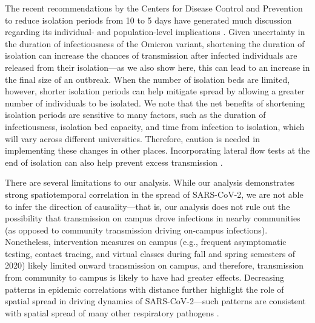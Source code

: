 \documentclass[12pt]{article}
\begin{document}
The recent recommendations by the Centers for Disease Control and Prevention to reduce isolation periods from 10 to 5 days \citep{cdcisolation} have generated much discussion regarding its individual- and population-level implications \citep{soljak2022reducing}.
Given uncertainty in the duration of infectiousness of the Omicron variant, shortening the duration of isolation can increase the chances of transmission after infected individuals are released from their isolation---as we also show here, this can lead to an increase in the final size of an outbreak.
When the number of isolation beds are limited, however, shorter isolation periods can help mitigate spread by allowing a greater number of individuals to be isolated.
We note that the net benefits of shortening isolation periods are sensitive to many factors, such as the duration of infectiousness, isolation bed capacity, and time from infection to isolation, which will vary across different universities.
Therefore, caution is needed in implementing these changes in other places.
Incorporating lateral flow tests at the end of isolation can also help prevent excess transmission \citep{quilty2022test}.

There are several limitations to our analysis.
While our analysis demonstrates strong spatiotemporal correlation in the spread of SARS-CoV-2, we are not able to infer the direction of causality---that is, our analysis does not rule out the possibility that transmission on campus drove infections in nearby communities (as opposed to community transmission driving on-campus infections).
Nonetheless, intervention measures on campus (e.g., frequent asymptomatic testing, contact tracing, and virtual classes during fall and spring semesters of 2020) likely limited onward transmission on campus, and therefore, transmission from community to campus is likely to have had greater effects.
Decreasing patterns in epidemic correlations with distance further highlight the role of spatial spread in driving dynamics of SARS-CoV-2---such patterns are consistent with spatial spread of many other respiratory pathogens \citep{grenfell2001travelling, viboud2006synchrony, baker2019epidemic}.
\end{document}
